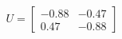 \documentclass[preview]{standalone}
\begin{document}
\begin{align*}
U=\left[\begin{matrix}-0.88&-0.47\\0.47&-0.88\end{matrix}\right]
\end{align*}
\end{document}
